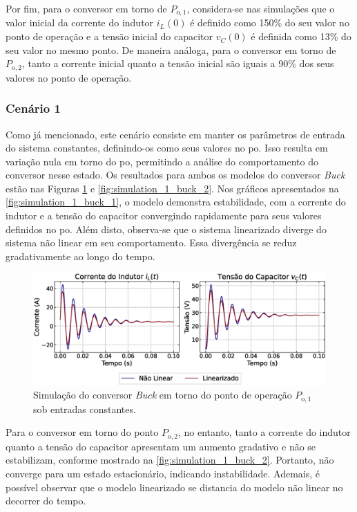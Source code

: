 Por fim, para o conversor em torno de $P_{\mathrm{o}, 1}$, considera-se nas simulações que o valor inicial da corrente do indutor $i_L(0)$ é definido como 150\% do seu valor no ponto de operação e a tensão inicial do capacitor $v_C(0)$ é definida como 13\% do seu valor no mesmo ponto. De maneira análoga, para o conversor em torno de $P_{\mathrm{o}, 2}$, tanto a corrente inicial quanto a tensão inicial são iguais a 90\% dos seus valores no ponto de operação.

\subsubsection{Cenário 1}

Como já mencionado, este cenário consiste em manter os parâmetros de entrada do sistema constantes, definindo-os como seus valores no \acrshort{po}. Isso resulta em variação nula em torno do \acrshort{po}, permitindo a análise do comportamento do conversor nesse estado. Os resultados para ambos os modelos do conversor \textit{Buck} estão nas Figuras \ref{fig:simulation_1_buck_1} e \ref{fig:simulation_1_buck_2}. Nos gráficos apresentados na \autoref{fig:simulation_1_buck_1}, o modelo demonstra estabilidade, com a corrente do indutor e a tensão do capacitor convergindo rapidamente para seus valores definidos no \acrshort{po}. Além disto, observa-se que o sistema linearizado diverge do sistema não linear em seu comportamento. Essa divergência se reduz gradativamente ao longo do tempo.

\begin{figure}[H]
  \centering
  \captionsetup{justification=centering}
  \includegraphics[width=1.\textwidth]{figuras/buck/sim1/op1/result.eps}
  \caption{Simulação do conversor \textit{Buck} em torno do ponto de operação $P_{\mathrm{o}, 1}$ sob entradas constantes.}
  \label{fig:simulation_1_buck_1}
\end{figure}

Para o conversor em torno do ponto $P_{\mathrm{o}, 2}$, no entanto, tanto a corrente do indutor quanto a tensão do capacitor apresentam um aumento gradativo e não se estabilizam, conforme mostrado na \autoref{fig:simulation_1_buck_2}. Portanto, não converge para um estado estacionário, indicando instabilidade. Ademais, é possível observar que o modelo linearizado se distancia do modelo não linear no decorrer do tempo.

